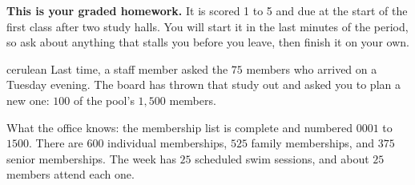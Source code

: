 \documentclass[12pt]{article}
\begin{document}

\vspace{0.12in}

\begin{remindbox}
\small
\textbf{This is your graded homework.} It is scored 1 to 5 and due at the start of the
first class after two study halls. You will start it in the last minutes of the period, so ask about anything that stalls
you before you leave, then finish it on your own.
\end{remindbox}

\vspace{0.08in}

\boxguard[20]
\begin{scenariobox}{cerulean}
Last time, a staff member asked the $75$ members who arrived on a Tuesday evening. The board
has thrown that study out and asked you to plan a new one: $100$ of the pool's $1{,}500$
members.

\vspace{2pt}
What the office knows: the membership list is complete and numbered $0001$ to $1500$. There
are $600$ individual memberships, $525$ family memberships, and $375$ senior memberships. The
week has $25$ scheduled swim sessions, and about $25$ members attend each one.
\end{scenariobox}

\vspace{0.08in}
\end{document}
